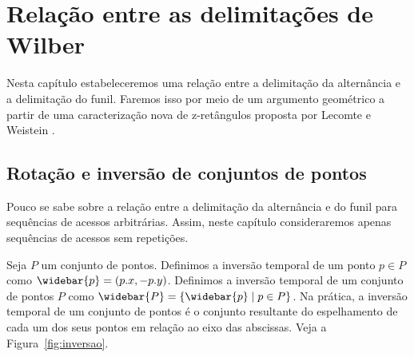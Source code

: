 
\chapter{Relação entre as delimitações de Wilber}
\label{cap:relacao-wilber}

Nesta capítulo estabeleceremos uma relação entre a delimitação da alternância e a delimitação do funil. Faremos isso por meio de um argumento geométrico a partir de uma caracterização nova de z-retângulos proposta por Lecomte e Weistein \cite{new_boundaries}.

\section{Rotação e inversão de conjuntos de pontos}
Pouco se sabe sobre a relação entre a delimitação da alternância e do funil para sequências de acessos arbitrárias. Assim, neste capítulo consideraremos apenas sequências de acessos sem repetições.

Seja $P$ um conjunto de pontos. Definimos a inversão temporal de um ponto $p \in P$ como $\widebar{p} = (p.x,-p.y)$. Definimos a inversão temporal de um conjunto de pontos $P$ como $\widebar{P} = \{\widebar{p} \mid p \in P\}$. Na prática, a inversão temporal de um conjunto de pontos é o conjunto resultante do espelhamento de cada um dos seus pontos em relação ao eixo das abscissas. Veja a Figura~\ref{fig:inversao}.

